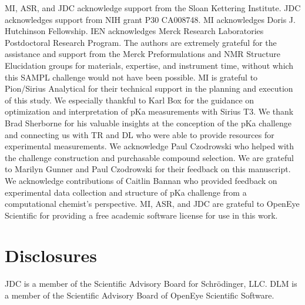 \documentclass[9pt,lineno]{elife}
\begin{document}
MI, ASR, and JDC acknowledge support from the Sloan Kettering Institute.
JDC acknowledges support from NIH grant P30 CA008748. 
MI acknowledges Doris J. Hutchinson Fellowship. IEN acknowledges Merck Research Laboratories Postdoctoral Research Program.
The authors are extremely grateful for the assistance and support from the Merck Preformulations and NMR Structure Elucidation groups for materials, expertise, and instrument time, without which this SAMPL challenge would not have been possible.
MI is grateful to Pion/Sirius Analytical for their technical support in the planning and execution of this study. We especially thankful to Karl Box for the guidance on optimization and interpretation of pKa measurements with Sirius T3. 
We thank Brad Sherborne for his valuable insights at the conception of the pKa challenge and connecting us with TR and DL who were able to provide resources for experimental measurements. We acknowledge Paul Czodrowski who helped with the challenge construction and purchasable compound selection. We are grateful to Marilyn Gunner and  Paul Czodrowski for their feedback on this manuscript.
We acknowledge contributions of Caitlin Bannan who provided feedback on experimental data collection and structure of pKa challenge from a computational chemist's perspective. 
MI, ASR, and JDC are grateful to OpenEye Scientific for providing a free academic software license for use in this work.

\section{Disclosures}

JDC is a member of the Scientific Advisory Board for Schr\"{o}dinger, LLC.
DLM is a member of the Scientific Advisory Board of OpenEye Scientific Software.

\nocite{*} %


\end{document}
